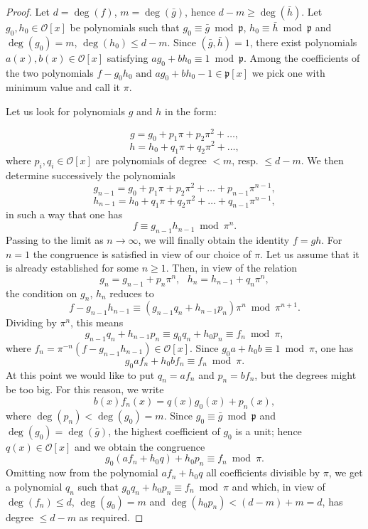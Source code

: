 \documentclass{article}
\begin{document}
\begin{proof}
Let $d = \deg(f)$, $m = \deg(\bar{g})$, hence $d - m \ge \deg(\bar{h})$. Let $g_0, h_0 \in \mathcal{O}[x]$ be polynomials such that $g_0 \equiv \bar{g} \bmod \mathfrak{p}$, $h_0 \equiv \bar{h} \bmod \mathfrak{p}$ and $\deg(g_0) = m$, $\deg(h_0) \le d-m$. Since $(
\bar{g}, \bar{h}) = 1$, there exist polynomials $a(x), b(x) \in \mathcal{O}[x]$ satisfying $ag_0 + bh_0 \equiv 1 \bmod \mathfrak{p}$.  Among the coefficients of the two polynomials $f-g_0h_0 \mbox{ and } ag_0 + bh_0 - 1 \in \mathfrak{p}[x]$ we pick one with minimum value and call it $\pi$.

Let us look for polynomials $g$ and $h$ in the form:

$$g = g_0 + p_1\pi + p_2\pi^2 + \ldots,$$
$$h = h_0 + q_1\pi + q_2\pi^2 + \ldots,$$
where $p_i, q_i \in \mathcal{O}[x]$ are polynomials of degree $< m$, resp. $\le d - m$.  We then determine successively the polynomials
$$g_{n-1} = g_0 + p_1\pi + p_2\pi^2 + \ldots + p_{n-1}\pi^{n-1},$$
$$h_{n-1} = h_0 + q_1\pi + q_2\pi^2 + \ldots + q_{n-1}\pi^{n-1},$$
in such a way that one has
$$f \equiv g_{n-1}h_{n-1} \bmod \pi^n.$$
Passing to the limit as $n \to \infty$, we will finally obtain the identity $f = gh$.  For $n=1$ the congruence is satisfied in view of our choice of $\pi$.  Let us assume that it is already established for some $n \ge 1$.  Then, in view of the relation
$$g_n = g_{n-1} + p_n\pi^n, \mbox{ } h_n = h_{n-1} + q_n\pi^n,$$
the condition on $g_n$, $h_n$ reduces to
$$f - g_{n-1}h_{n-1} \equiv (g_{n-1}q_n + h_{n-1}p_n)\pi^n \bmod \pi^{n+1}.$$
Dividing by $\pi^n$, this means
$$g_{n-1}q_n + h_{n-1}p_n \equiv g_0q_n + h_0p_n \equiv f_n \bmod \pi,$$
where $f_n = \pi^{-n}(f - g_{n-1}h_{n-1}) \in \mathcal{O}[x]$.  Since $g_0a + h_0b \equiv 1 \bmod \pi$, one has
$$g_0af_n + h_0bf_n \equiv f_n \bmod \pi.$$
At this point we would like to put $q_n = af_n$ and $p_n = bf_n$, but the degrees might be too big.  For this reason, we write
$$b(x)f_n(x) = q(x)g_0(x) + p_n(x),$$
where $\deg(p_n) < \deg(g_0) = m$.  Since $g_0 \equiv \bar{g} \bmod \mathfrak{p}$ and $\deg(g_0) = \deg(\bar{g})$, the highest coefficient of $g_0$ is a unit; hence $q(x) \in \mathcal{O}[x]$ and we obtain the congruence
$$g_0(af_n + h_0q) + h_0p_n \equiv f_n \bmod \pi.$$
Omitting now from the polynomial $af_n + h_0q$ all coefficients divisible by $\pi$, we get a polynomial $q_n$ such that $g_0q_n + h_0p_n \equiv f_n \bmod \pi$ and which, in view of $\deg(f_n) \le d$, $\deg(g_0) = m$ and $\deg(h_0p_n) < (d-m) + m = d$, has degree $\le d-m$ as required.
\end{proof}
\end{document}
